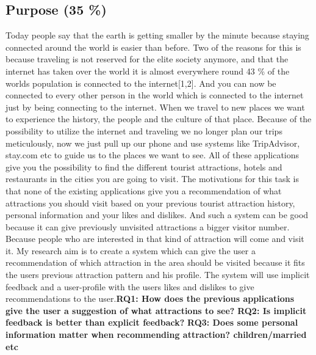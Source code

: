 \documentclass[12pt,runningheads]{article}
\begin{document}
\subsection*{Purpose (35 \%)}
Today people say that the earth is getting smaller by the minute because staying connected around the world is easier than before. Two of the reasons for this is because traveling is not reserved for the elite society anymore, and that the internet has taken over the world it is almost everywhere round 43 \% of the worlds population is connected to the internet[1,2]. And you can now be connected to every other person in the world which is connected to the internet just by being connecting to the internet. \newline\newline When we travel to new places we want to experience the history, the people and the culture of that place. Because of the possibility to utilize the internet and traveling we no longer plan our trips meticulously, now we just pull up our phone and use systems like TripAdvisor, stay.com etc to guide us to the places we want to see. All of these applications give you the possibility to find the different tourist attractions, hotels and restaurants in the cities you are going to visit. The motivations for this task is that none of the existing applications give you a recommendation of what attractions you should visit based on your previous tourist attraction history, personal information and your likes and dislikes. And such a system can be good because it can give previously unvisited attractions a bigger visitor number. Because people who are interested in that kind of attraction will come and visit it. \newline\newline My research aim is to create a system which can give the user a recommendation of which attraction in the area should be visited because it fits the users previous attraction pattern and his profile. The system will use implicit feedback and a user-profile with the users likes and dislikes to give recommendations to the user.\newline \textbf{RQ1: How does the previous applications give the user a suggestion of what attractions to see?}\newline
\textbf{RQ2: Is implicit feedback is better than explicit feedback?} \newline
\textbf{RQ3: Does some personal information matter when recommending attraction? children/married etc}
\end{document}
